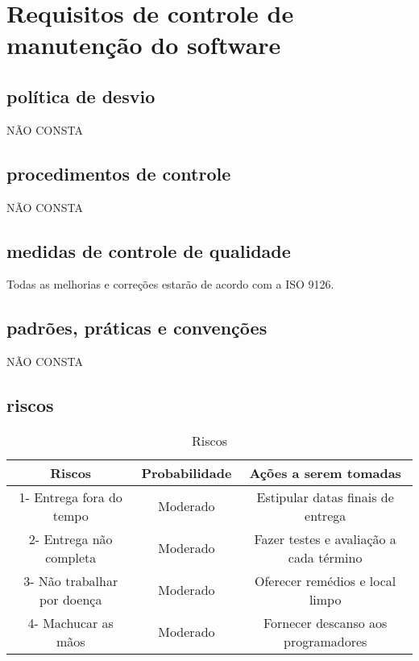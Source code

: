 \chapter{Requisitos de controle de manutenção do software}

\section{política de desvio}
NÃO CONSTA
\section{procedimentos de controle}
NÃO CONSTA
\section{medidas de controle de qualidade}
Todas as melhorias e correções  estarão de acordo com a ISO 9126.
\section{padrões, práticas e convenções}
NÃO CONSTA
\section{riscos}
\begin{table}[!htb]
	\caption[Riscos]{Riscos}
	\label{tab:riscos}
	\centering
	\begin{tabular}{c|c|c}
		Riscos                           &  Probabilidade        &  Ações a serem tomadas	                          \\ \hline
		1- Entrega fora do tempo         &  Moderado             &  Estipular datas finais de entrega    						\\
	  2- Entrega não completa          & 	Moderado	           &  Fazer testes e avaliação a cada término         \\
    3- Não trabalhar por doença      & 	Moderado	           &  Oferecer remédios e local limpo                 \\
    4- Machucar as mãos              & 	Moderado	           &  Fornecer descanso aos programadores             \\
	\end{tabular}
\end{table}

